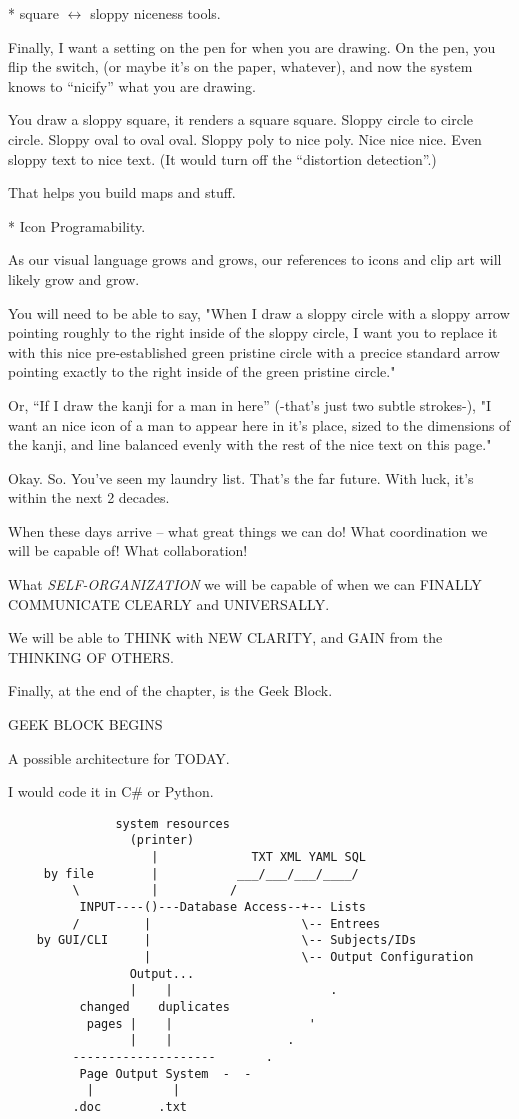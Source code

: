\documentclass[oneside,fontsize=10,a5paper]{scrbook}
\begin{document}
* square $\leftrightarrow$ sloppy niceness tools.

Finally, I want a setting on the pen for when you are drawing. On the
pen, you flip the switch, (or maybe it's on the paper, whatever), and
now the system knows to ``nicify'' what you are drawing.

You draw a sloppy square, it renders a square square. Sloppy circle to
circle circle. Sloppy oval to oval oval. Sloppy poly to nice
poly. Nice nice nice. Even sloppy text to nice text. (It would turn
off the ``distortion detection''.)

That helps you build maps and stuff.

* Icon Programability.

As our visual language grows and grows, our references to icons and
clip art will likely grow and grow.

You will need to be able to say, "When I draw a sloppy circle with a
sloppy arrow pointing roughly to the right inside of the sloppy
circle, I want you to replace it with this nice pre-established green
pristine circle with a precice standard arrow pointing exactly to the
right inside of the green pristine circle."

Or, ``If I draw the kanji for a man in here'' (-that's just two subtle
strokes-), "I want an nice icon of a man to appear here in it's place,
sized to the dimensions of the kanji, and line balanced evenly with
the rest of the nice text on this page."

Okay. So.
You've seen my laundry list.
That's the far future. With luck, it's within the next 2 decades.

When these days arrive -- what great things we can do! What coordination
we will be capable of! What collaboration!

What \emph{SELF-ORGANIZATION} we will be capable of when we can FINALLY
COMMUNICATE CLEARLY and UNIVERSALLY.

We will be able to THINK with NEW CLARITY, and GAIN from the THINKING
OF OTHERS.

Finally, at the end of the chapter, is the Geek Block.

GEEK BLOCK BEGINS

A possible architecture for TODAY.

I would code it in C\# or Python.

\begin{verbatim}
               system resources
                 (printer)
                    |             TXT XML YAML SQL
     by file        |           ___/___/___/____/
         \          |          /
          INPUT----()---Database Access--+-- Lists
         /         |                     \-- Entrees
    by GUI/CLI     |                     \-- Subjects/IDs
                   |                     \-- Output Configuration
                 Output...
                 |    |                      .
          changed    duplicates
           pages |    |                   '
                 |    |                .
         --------------------       .
          Page Output System  -  -
           |           |
         .doc        .txt
\end{verbatim}
\end{document}
